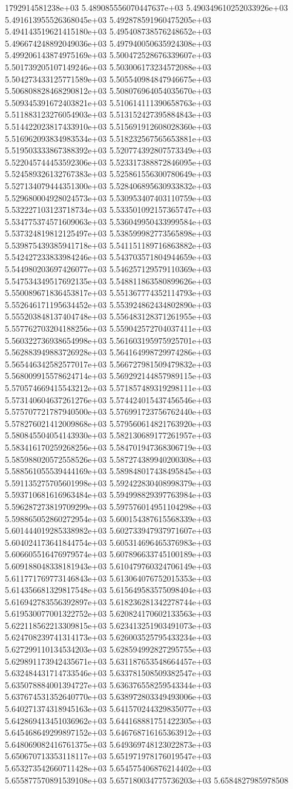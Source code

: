 1792914581238e+03	5.489085556070447637e+03	5.490349610252033926e+03	5.491613955526368045e+03	5.492878591960475205e+03	5.494143519621415180e+03	5.495408738576248652e+03	5.496674248892049036e+03	5.497940050635924308e+03	5.499206143874975169e+03	5.500472528676339607e+03	5.501739205107149246e+03	5.503006173234572088e+03	5.504273433125771589e+03	5.505540984847946675e+03	5.506808828468290812e+03	5.508076964054035670e+03	5.509345391672403821e+03	5.510614111390658763e+03	5.511883123276054903e+03	5.513152427395884843e+03	5.514422023817433910e+03	5.515691912608028360e+03	5.516962093834983534e+03	5.518232567565653881e+03	5.519503333867388392e+03	5.520774392807573349e+03	5.522045744453592306e+03	5.523317388872846095e+03	5.524589326132767383e+03	5.525861556300780649e+03	5.527134079444351300e+03	5.528406895630933832e+03	5.529680004928024573e+03	5.530953407403110759e+03	5.532227103123718734e+03	5.533501092157365747e+03	5.534775374571609063e+03	5.536049950433999584e+03	5.537324819812125497e+03	5.538599982773565898e+03	5.539875439385941718e+03	5.541151189716863882e+03	5.542427233833984246e+03	5.543703571804944659e+03	5.544980203697426077e+03	5.546257129579110369e+03	5.547534349517692135e+03	5.548811863580899626e+03	5.550089671836453817e+03	5.551367774352114793e+03	5.552646171195634452e+03	5.553924862434802890e+03	5.555203848137404748e+03	5.556483128371261955e+03	5.557762703204188256e+03	5.559042572704037411e+03	5.560322736938654998e+03	5.561603195975925701e+03	5.562883949883726928e+03	5.564164998729974286e+03	5.565446342582577017e+03	5.566727981509479832e+03	5.568009915578624714e+03	5.569292144857989115e+03	5.570574669415543212e+03	5.571857489319298111e+03	5.573140604637261276e+03	5.574424015437456546e+03	5.575707721787940500e+03	5.576991723756762440e+03	5.578276021412009868e+03	5.579560614821763920e+03	5.580845504054143930e+03	5.582130689177261957e+03	5.583416170259268256e+03	5.584701947368306719e+03	5.585988020572558526e+03	5.587274389940200308e+03	5.588561055539444169e+03	5.589848017438495845e+03	5.591135275705601998e+03	5.592422830408998379e+03	5.593710681616963484e+03	5.594998829397763984e+03	5.596287273819709299e+03	5.597576014951104298e+03	5.598865052860272954e+03	5.600154387615568339e+03	5.601444019285338982e+03	5.602733947937971607e+03	5.604024173641844754e+03	5.605314696465376983e+03	5.606605516476979574e+03	5.607896633745100189e+03	5.609188048338181943e+03	5.610479760324706149e+03	5.611771769773146843e+03	5.613064076752015353e+03	5.614356681329817548e+03	5.615649583575098404e+03	5.616942783556392897e+03	5.618236281342278744e+03	5.619530077001322752e+03	5.620824170602133563e+03	5.622118562213309815e+03	5.623413251903491073e+03	5.624708239741314173e+03	5.626003525795433234e+03	5.627299110134534203e+03	5.628594992827295755e+03	5.629891173942435671e+03	5.631187653548664457e+03	5.632484431714733546e+03	5.633781508509382547e+03	5.635078884001394727e+03	5.636376558259543344e+03	5.637674531352640770e+03	5.638972803349493006e+03	5.640271374318945163e+03	5.641570244329835077e+03	5.642869413451036962e+03	5.644168881751422305e+03	5.645468649299897152e+03	5.646768716165363912e+03	5.648069082416761375e+03	5.649369748123022873e+03	5.650670713353118117e+03	5.651971978176019547e+03	5.653273542660711428e+03	5.654575406876214402e+03	5.655877570891539108e+03	5.657180034775736203e+03	5.6584827985978508